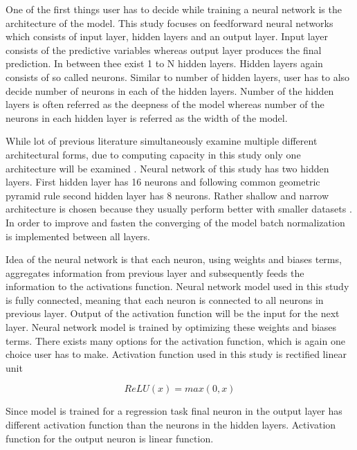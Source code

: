 \documentclass{article}
\begin{document}
One of the first things user has to decide while training a neural network is the architecture of the model. This study focuses on feedforward neural networks which consists of input layer, hidden layers and an output layer. Input layer consists of the predictive variables whereas output layer produces the final prediction. In between thee exist 1 to N hidden layers. Hidden layers again consists of  so called neurons. Similar to number of hidden layers, user has to also decide number of neurons in each of the hidden layers. Number of the hidden layers is often referred as the deepness of the model whereas number of the neurons in each hidden layer is referred as the width of the model. \par

While lot of previous literature simultaneously examine multiple different architectural forms, due to computing capacity in this study only one architecture will be examined \cite{guetal, HANAUER2023, TOBEK2021100588}. Neural network of this study has two hidden layers. First hidden layer has 16 neurons and following common geometric pyramid rule second hidden layer has 8 neurons. Rather shallow and narrow architecture is chosen because they usually perform better with smaller datasets \cite{guetal}. In order to improve and fasten the converging of the model batch normalization is implemented between all layers. \par

Idea of the neural network is that each neuron, using weights and biases terms, aggregates information from previous layer and subsequently feeds the information to the activations function. Neural network model used in this study is fully connected, meaning that each neuron is connected to all neurons in previous layer. Output of the activation function will be the input for the next layer. Neural network model is trained by optimizing these weights and biases terms. There exists many options for the activation function, which is again one choice user has to make. Activation function used in this study is rectified linear unit \par

\begin{equation}
\label{ReLU}
ReLU(x) = max(0, x)
\end{equation}

Since model is trained for a regression task final neuron in the output layer has different activation function than the neurons in the hidden layers. Activation function for the output neuron is linear function. \par
\end{document}
